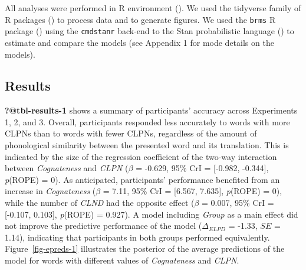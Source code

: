 \documentclass[
]{article}
\begin{document}
All analyses were performed in R environment
(). We used the tidyverse family
of R packages () to process data and to generate figures. We used the
\texttt{brms} R package ()
using the \texttt{cmdstanr} back-end to the Stan probabilistic language
() to estimate
and compare the models (see Appendix 1 for mode details on the models).

\subsection{Results}\label{results}

\textbf{?@tbl-results-1} shows a summary of participants' accuracy
across Experiments 1, 2, and 3. Overall, participants responded less
accurately to words with more CLPNs than to words with fewer CLPNs,
regardless of the amount of phonological similarity between the
presented word and its translation. This is indicated by the size of the
regression coefficient of the two-way interaction between
\emph{Cognateness} and \emph{CLPN} (\(\beta\) = -0.629, 95\% CrI =
{[}-0.982, -0.344{]}, \emph{p}(ROPE) = 0). As anticipated, participants'
performance benefited from an increase in \emph{Cognateness} (\(\beta\)
= 7.11, 95\% CrI = {[}6.567, 7.635{]}, \emph{p}(ROPE) = 0), while the
number of \emph{CLND} had the opposite effect (\(\beta\) = 0.007, 95\%
CrI = {[}-0.107, 0.103{]}, \emph{p}(ROPE) = 0.927). A model including
\emph{Group} as a main effect did not improve the predictive performance
of the model (\(\Delta_{ELPD}\) = -1.33, \(SE\) = 1.14), indicating that
participants in both groups performed equivalently.
Figure~\ref{fig-epreds-1} illustrates the posterior of the average
predictions of the model for words with different values of
\emph{Cognateness} and \emph{CLPN}.

\captionsetup{labelsep=none}
\end{document}
